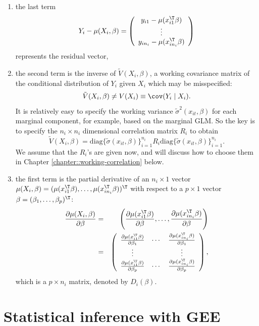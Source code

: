 \begin{enumerate}[label=(T\arabic*), ref=T\arabic*] 
\item the last term 
\[
Y_{i}-\mu(X_{i},\beta)=\left(\begin{array}{c}
y_{i1} -\mu(x_{i1}^{\T}\beta)\\
\vdots\\
y_{in_{i}} -\mu(x_{in_{i}}^{\T}\beta)
\end{array}\right)
\]
represents the residual vector,
\item the second term is the inverse of $\tilde{V}(X_{i}, \beta)$, a working covariance
matrix of the conditional distribution of $Y_{i}$ given $X_{i}$
which may be misspecified:
\[
\tilde{V}(X_{i}, \beta)\neq V(X_{i})\equiv\cov(Y_{i}\mid X_{i}).
\]
It is relatively easy to specify the working variance $\tilde{\sigma}^2(x_{it}, \beta)$ for each marginal component, for example, based on the marginal GLM.  So the key is to specify the $n_i\times n_i$ dimensional correlation matrix $R_i$ to obtain 
$$
\tilde{V}(X_{i}, \beta) = \text{diag}\{ \tilde{\sigma} (x_{it}, \beta) \}_{i=1}^{n_i} R_i \text{diag}\{ \tilde{\sigma} (x_{it}, \beta) \}_{i=1}^{n_i}.
$$
We assume that the $R_i$'s are given now, and will discuss how to choose them in Chapter \ref{chapter::working-correlation} below. 
\item the first term is the partial derivative of an $n_i \times 1$ 
vector $\mu (X_{i},\beta)=(\mu(x_{i1}^{\T}\beta),\ldots,\mu(x_{in_{i}}^{\T}\beta))^{\T}$
with respect to a $p\times1$ vector $\beta=(\beta_{1},\ldots,\beta_{p})^{\T}$:
\begin{eqnarray*}
\frac{\partial\mu (X_{i},\beta)}{\partial\beta}
&=& \left(  \frac{\partial \mu(x_{i1}^{\T}\beta)}{\partial \beta},\ldots,  \frac{ \partial  \mu(x_{in_{i}}^{\T}\beta)}{\partial \beta} \right)  \\
&=&\left(\begin{array}{ccc}
\frac{\partial\mu(x_{i1}^{\T}\beta)}{\partial\beta_{1}} & \cdots & \frac{\partial\mu(x_{in_{i}}^{\T}\beta)}{\partial\beta_{1}}\\
\vdots &  & \vdots\\
\frac{\partial\mu(x_{i1}^{\T}\beta)}{\partial\beta_{p}} & \cdots & \frac{\partial\mu(x_{in_{i}}^{\T}\beta)}{\partial\beta_{p}}
\end{array}\right),
\end{eqnarray*}
which is a $p\times n_i$ matrix, denoted by $D_{i} (\beta).$
\end{enumerate}

\section{Statistical inference with GEE}

